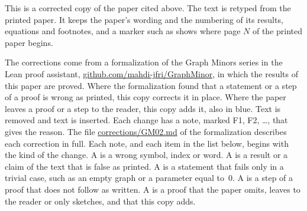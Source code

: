 
This is a corrected copy of the paper cited above. The text is retyped from the printed paper.
It keeps the paper's wording and the numbering of its results, equations and footnotes, and a
marker such as  shows where page $N$ of the printed paper begins.

The corrections come from a formalization of the Graph Minors series in the Lean proof
assistant, \href{https://github.com/mahdi-jfri/GraphMinor}{github.com/mahdi-jfri/GraphMinor},
in which the results of this paper are proved. Where the formalization found that a statement
or a step of a proof is wrong as printed, this copy corrects it in place. Where the paper leaves a proof or a step to the reader, this copy adds it, also in blue. Text  is removed and text  is inserted. Each change has a note, marked
\textcolor{fixcolor}{\sffamily F1}, \textcolor{fixcolor}{\sffamily F2}, \dots, that gives the
reason. The file
\href{https://github.com/mahdi-jfri/GraphMinor/blob/main/corrections/GM02.md}{corrections/GM02.md}
of the formalization describes each correction in full. Each note, and each item in the list below, begins with the kind of the change. A  is a wrong symbol, index or word. A  is a result or a claim of the text that is false as printed. A  is a statement that fails only in a trivial case, such as an empty graph or a parameter equal to~$0$. A  is a step of a proof that does not follow as written. A  is a proof that the paper omits, leaves to the reader or only sketches, and that this copy adds.

